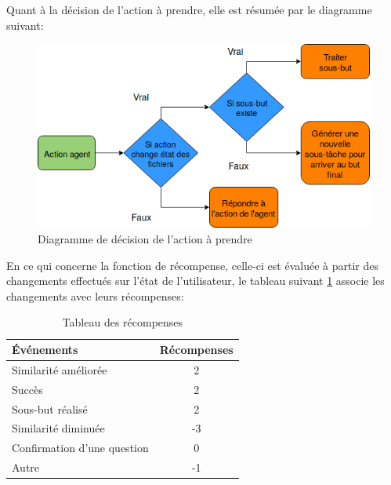 Quant à la décision de l'action à prendre, elle est résumée par le diagramme suivant:
\begin{figure}[H] 
	\centering
	\includegraphics[width=0.6\linewidth]{images/Conception/DM/action_diag.png}
	\caption{Diagramme de décision de l'action à prendre}
	
\end{figure}\label{action_diag}
En ce qui concerne la fonction de récompense, celle-ci est évaluée à partir des changements effectués sur l'état de l'utilisateur, le tableau suivant \ref{table_reward} associe les changements avec leurs récompenses:
\begin{table}[H]\label{table_reward}
	\begin{center}
		
		\begin{tabular}{|l|c|} %
			\hline
			\textbf{Événements} & \textbf{Récompenses}\\
			\hline
			Similarité améliorée & 2\\
			\hline
			Succès & 2\\
			\hline
			Sous-but réalisé & 2\\
			\hline
			Similarité diminuée & -3\\
			\hline
			Confirmation d'une question & 0\\
			\hline
			Autre & -1\\
			\hline
		\end{tabular}
		\caption{Tableau des récompenses}
	\end{center}
\end{table}
